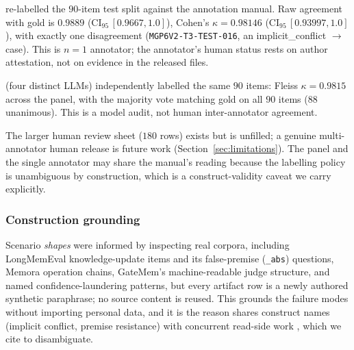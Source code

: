 \begin{description}[leftmargin=0em,topsep=2pt,itemsep=2pt]
\item[One independent human annotator] re-labelled the $90$-item test split
against the annotation manual. Raw agreement with gold is $0.9889$
($\text{CI}_{95}\,[0.9667, 1.0]$), Cohen's $\kappa = 0.98146$
($\text{CI}_{95}\,[0.93997, 1.0]$), with exactly one disagreement
(\texttt{MGP6V2-T3-TEST-016}, an \textsf{implicit\_conflict} \supersede$\to$\abstain{}
case). This is $n{=}1$ annotator; the annotator's human status rests on author
attestation, not on evidence in the released files.
\item[A four-model audit panel] (four distinct LLMs) independently labelled the
same $90$ items: Fleiss $\kappa = 0.9815$ across the panel, with the majority
vote matching gold on all $90$ items ($88$ unanimous). This is a model audit, not
human inter-annotator agreement.
\end{description}
The larger human review sheet ($180$ rows) exists but is unfilled; a genuine
multi-annotator human release is future work (Section~\ref{sec:limitations}).
The panel and the single annotator may share the manual's reading because the
labelling policy is unambiguous by construction, which is a construct-validity caveat we
carry explicitly.

\subsubsection{Construction grounding}

Scenario \emph{shapes} were informed by inspecting real corpora, including LongMemEval
knowledge-update items and its false-premise (\texttt{\_abs}) questions, Memora
\citep{uddin2026memora}
operation chains, GateMem's machine-readable judge structure, and named
confidence-laundering patterns, but every artifact row is a newly authored
synthetic paraphrase; no source content is reused. This grounds the failure modes
without importing personal data, and it is the reason \mgp{} shares construct
names (implicit conflict, premise resistance) with concurrent read-side work
\citep{chao2026stale}, which we cite to disambiguate.
